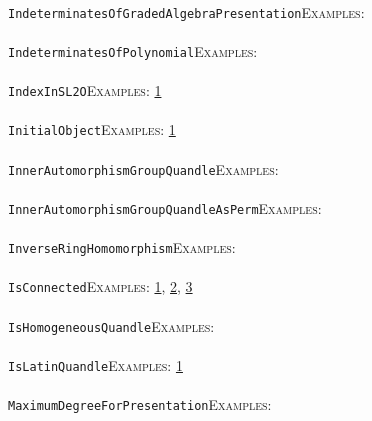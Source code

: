 \documentclass[a4paper,11pt]{report}
\begin{document}
{{ \\
 \texttt{IndeterminatesOfGradedAlgebraPresentation}{\nobreakspace}{\nobreakspace}{\nobreakspace}{\nobreakspace}\textsc{Examples:} \\
 \\
 \texttt{IndeterminatesOfPolynomial}{\nobreakspace}{\nobreakspace}{\nobreakspace}{\nobreakspace}\textsc{Examples:} \\
 \\
 \texttt{IndexInSL2O}{\nobreakspace}{\nobreakspace}{\nobreakspace}{\nobreakspace}\textsc{Examples:} \href{tutorial/chap10.html} {1}{\nobreakspace} \\
 \\
 \texttt{InitialObject}{\nobreakspace}{\nobreakspace}{\nobreakspace}{\nobreakspace}\textsc{Examples:} \href{../www/SideLinks/About/aboutAbelianCategories.html} {1}{\nobreakspace} \\
 \\
 \texttt{InnerAutomorphismGroupQuandle}{\nobreakspace}{\nobreakspace}{\nobreakspace}{\nobreakspace}\textsc{Examples:} \\
 \\
 \texttt{InnerAutomorphismGroupQuandleAsPerm}{\nobreakspace}{\nobreakspace}{\nobreakspace}{\nobreakspace}\textsc{Examples:} \\
 \\
 \texttt{InverseRingHomomorphism}{\nobreakspace}{\nobreakspace}{\nobreakspace}{\nobreakspace}\textsc{Examples:} \\
 \\
 \texttt{IsConnected}{\nobreakspace}{\nobreakspace}{\nobreakspace}{\nobreakspace}\textsc{Examples:} \href{../www/SideLinks/About/aboutQuandles2.html} {1}{\nobreakspace}, \href{../www/SideLinks/About/aboutQuandles.html} {2}{\nobreakspace}, \href{../www/SideLinks/About/aboutKnotsQuandles.html} {3}{\nobreakspace} \\
 \\
 \texttt{IsHomogeneousQuandle}{\nobreakspace}{\nobreakspace}{\nobreakspace}{\nobreakspace}\textsc{Examples:} \\
 \\
 \texttt{IsLatinQuandle}{\nobreakspace}{\nobreakspace}{\nobreakspace}{\nobreakspace}\textsc{Examples:} \href{../www/SideLinks/About/aboutQuandles.html} {1}{\nobreakspace} \\
 \\
 \texttt{MaximumDegreeForPresentation}{\nobreakspace}{\nobreakspace}{\nobreakspace}{\nobreakspace}\textsc{Examples:} \\
 \\
}}
\end{document}
